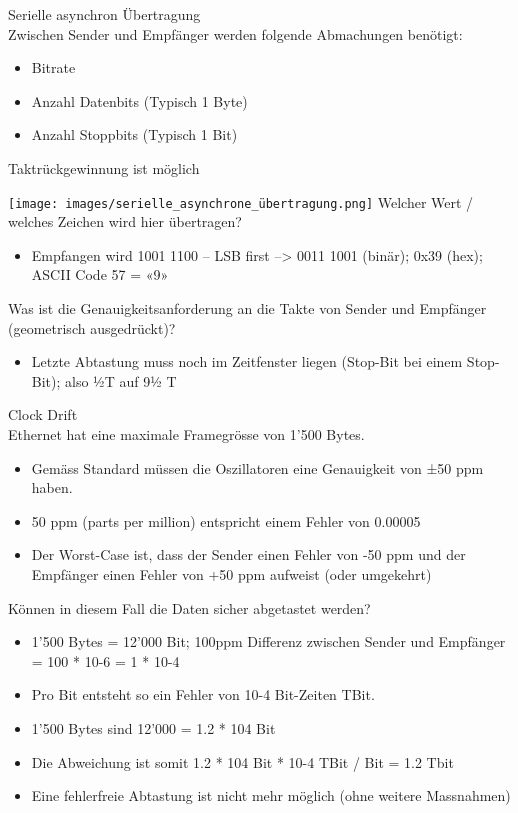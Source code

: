 \begin{definition}{Serielle asynchron Übertragung}\\
    Zwischen Sender und Empfänger werden folgende Abmachungen benötigt:
    \begin{itemize}
        \item Bitrate
        \item Anzahl Datenbits (Typisch 1 Byte)
        \item Anzahl Stoppbits (Typisch 1 Bit)
    \end{itemize}
    Taktrückgewinnung ist möglich
\end{definition}

\begin{example}
    \texttt{[image: images/serielle\_asynchrone\_übertragung.png]}
    Welcher Wert / welches Zeichen wird hier übertragen?
    \begin{itemize}
        \item Empfangen wird 1001 1100 – LSB first –> 0011 1001 (binär); 0x39 (hex); ASCII Code 57 = «9»
    \end{itemize}
    Was ist die Genauigkeitsanforderung an die Takte von Sender und Empfänger (geometrisch
    ausgedrückt)?
    \begin{itemize}
        \item Letzte Abtastung muss noch im Zeitfenster liegen (Stop-Bit bei einem Stop-Bit); also ½T auf 9½ T
    \end{itemize}
\end{example}

\begin{KR}{Clock Drift}\\
    Ethernet hat eine maximale Framegrösse von 1’500 Bytes.
    \begin{itemize}
        \item Gemäss Standard müssen die Oszillatoren eine Genauigkeit von ±50 ppm haben.
        \item 50 ppm (parts per million) entspricht einem Fehler von 0.00005
        \item Der Worst-Case ist, dass der Sender einen Fehler von -50 ppm und der Empfänger einen Fehler von +50 ppm aufweist (oder umgekehrt)
    \end{itemize}
    Können in diesem Fall die Daten sicher abgetastet werden?
    \begin{itemize}
        \item 1'500 Bytes = 12'000 Bit; 100ppm Differenz zwischen Sender und Empfänger = 100 * 10-6 = 1 * 10-4
        \item Pro Bit entsteht so ein Fehler von 10-4 Bit-Zeiten TBit.
        \item 1’500 Bytes sind 12’000 = 1.2 * 104 Bit
        \item Die Abweichung ist somit 1.2 * 104 Bit * 10-4 TBit / Bit = 1.2 Tbit
        \item Eine fehlerfreie Abtastung ist nicht mehr möglich (ohne weitere Massnahmen)
    \end{itemize}
\end{KR}

